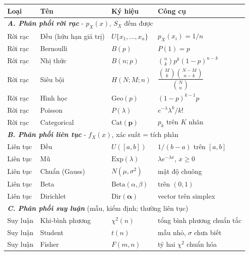 \documentclass[12pt,a4paper]{article}
\begin{document}
\begin{congthuc}[title={Phân loại các phân phối trong mục này}]
\small
\begin{center}
\renewcommand{\arraystretch}{1.15}
\begin{tabular}{llll}
\toprule
\textbf{Loại} & Tên & Ký hiệu & Công cụ \\
\midrule
\multicolumn{4}{l}{\textit{\textbf{A. Phân phối rời rạc}} - $p_X(x)$, $S_X$ đếm được} \\
\midrule
Rời rạc & Đều (hữu hạn giá trị) & $U\{x_1,\ldots,x_n\}$ & $p_X(x_i)=1/n$ \\
Rời rạc & Bernoulli & $B(p)$ & $P(1)=p$ \\
Rời rạc & Nhị thức & $B(n;p)$ & $\binom{n}{k}p^k(1-p)^{n-k}$ \\
Rời rạc & Siêu bội & $H(N;M;n)$ & $\dfrac{\binom{M}{k}\binom{N-M}{n-k}}{\binom{N}{n}}$ \\
Rời rạc & Hình học & $\mathrm{Geo}(p)$ & $(1-p)^{k-1}p$ \\
Rời rạc & Poisson & $P(\lambda)$ & $e^{-\lambda}\lambda^k/k!$ \\
Rời rạc & Categorical & $\mathrm{Cat}(\mathbf{p})$ & $p_k$ trên $K$ nhãn \\
\midrule
\multicolumn{4}{l}{\textit{\textbf{B. Phân phối liên tục}} - $f_X(x)$, xác suất = tích phân} \\
\midrule
Liên tục & Đều & $U([a,b])$ & $1/(b-a)$ trên $[a,b]$ \\
Liên tục & Mũ & $\mathrm{Exp}(\lambda)$ & $\lambda e^{-\lambda x}$, $x\ge 0$ \\
Liên tục & Chuẩn (Gauss) & $N(\mu,\sigma^2)$ & mật độ chuông \\
Liên tục & Beta & $\mathrm{Beta}(\alpha,\beta)$ & trên $(0,1)$ \\
Liên tục & Dirichlet & $\mathrm{Dir}(\boldsymbol{\alpha})$ & vector trên simplex \\
\midrule
\multicolumn{4}{l}{\textit{\textbf{C. Phân phối suy luận}} (mẫu, kiểm định; thường liên tục)} \\
\midrule
Suy luận & Khi-bình phương & $\chi^2(n)$ & tổng bình phương chuẩn tắc \\
Suy luận & Student & $t(n)$ & mẫu nhỏ, $\sigma$ chưa biết \\
Suy luận & Fisher & $F(m,n)$ & tỷ hai $\chi^2$ chuẩn hóa \\
\bottomrule
\end{tabular}
\end{center}
\normalsize
\end{congthuc}
\end{document}
